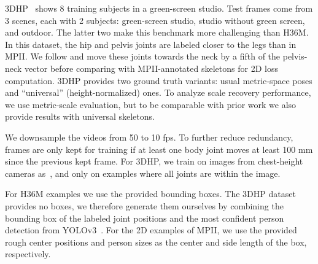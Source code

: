 3DHP~\cite{Mehta17TDV} shows 8 training subjects in a green-screen studio.
Test frames come from 3 scenes, each with 2 subjects: green-screen studio, studio without green screen, and outdoor.
The latter two make this benchmark more challenging than H36M.
In this dataset, the hip and pelvis joints are labeled closer to the legs than in MPII.
We follow \cite{Zhou17ICCV} and move these joints towards the neck by a fifth of the pelvis-neck vector before comparing with MPII-annotated skeletons for 2D loss computation.
3DHP provides two ground truth variants: usual metric-space poses and ``universal'' (height-normalized) ones.
To analyze scale recovery performance, we use metric-scale evaluation, but to be comparable with prior work we also provide results with universal skeletons.

We downsample the videos from 50 to 10 fps.
To further reduce redundancy, frames are only kept for training if at least one body joint moves at least 100 mm since the previous kept frame.
For 3DHP, we train on images from chest-height cameras as~\cite{Mehta17TDV}, and only on examples where all joints are within the image.

For H36M examples we use the provided bounding boxes.
The 3DHP dataset provides no boxes, we therefore generate them ourselves by combining the bounding box of the labeled joint positions and the most confident person detection from YOLOv3~\cite{Redmon18Arxiv}.
For the 2D examples of MPII, we use the provided rough center positions and person sizes as the center and side length of the box, respectively.

